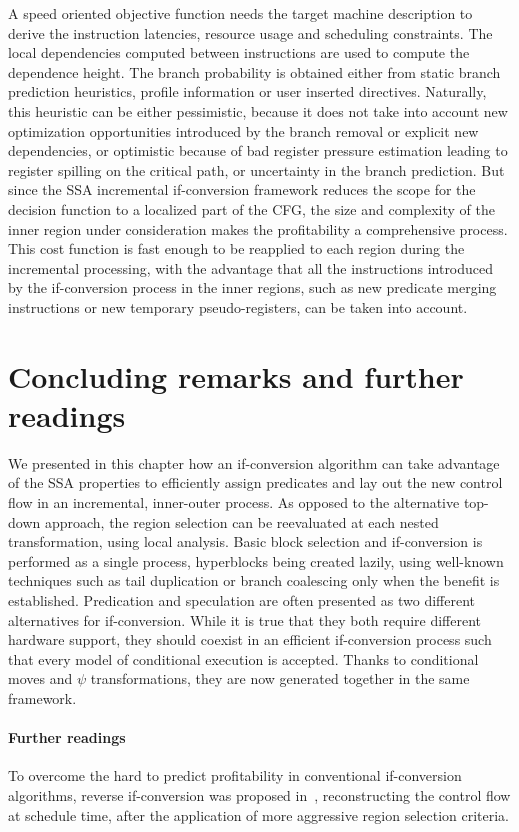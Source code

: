 A speed oriented objective function needs the target machine description to derive the instruction latencies, resource usage and scheduling constraints. 
The local dependencies computed between instructions are used to compute the dependence height. 
The branch probability is obtained either from static branch prediction heuristics, profile information or user inserted directives. 
Naturally, this heuristic can be either pessimistic, because it does not take into account new optimization opportunities introduced by the branch removal or explicit new dependencies, or optimistic because of bad register pressure estimation leading to register spilling on the critical path, or uncertainty in the branch prediction. 
But since the SSA incremental if-conversion framework reduces the scope for the decision function to a localized part of the CFG, the size and complexity of the inner region under consideration makes the profitability a comprehensive process. 
This cost function is fast enough to be reapplied to each region during the incremental processing, with the advantage that all the instructions introduced by the if-conversion process in the inner regions, such as new predicate merging instructions or new temporary pseudo-registers, can be taken into account.

\section{Concluding remarks and further readings} 
We presented in this chapter how an if-conversion algorithm can take advantage of the SSA properties to efficiently assign predicates and lay out the new control flow in an incremental, inner-outer process. 
As opposed to the alternative top-down approach, the region selection can be reevaluated at each nested transformation, using local analysis. 
Basic block selection and if-conversion is performed as a single process, hyperblocks being created lazily, using well-known techniques such as tail duplication or branch coalescing only when the benefit is established. 
Predication and speculation are often presented as two different alternatives for if-conversion. 
While it is true that they both require different hardware support, they should coexist in an efficient if-conversion process such that every model of conditional execution is accepted. 
Thanks to conditional moves and $\psi$ transformations, they are now generated together in the same framework.

\paragraph{Further readings}
To overcome the hard to predict profitability in conventional if-conversion algorithms, reverse if-conversion was proposed in~\cite{August:1999:PRI:326224.325595}, reconstructing the control flow at schedule time, after the application of more aggressive region selection criteria.

